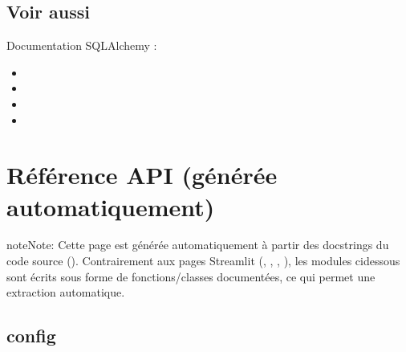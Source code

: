 \documentclass[letterpaper,10pt,english]{sphinxmanual}
\begin{document}
\section{Voir aussi}
\label{\detokenize{model:voir-aussi}}
\sphinxAtStartPar
Documentation SQLAlchemy :
\begin{itemize}
\item {} 
\sphinxAtStartPar
{}

\item {} 
\sphinxAtStartPar
{}

\item {} 
\sphinxAtStartPar
{}

\item {} 
\sphinxAtStartPar
{}

\end{itemize}

\sphinxstepscope


\chapter{Référence API (générée automatiquement)}
\label{\detokenize{api:reference-api-generee-automatiquement}}\label{\detokenize{api::doc}}
\begin{sphinxadmonition}{note}{Note:}
\sphinxAtStartPar
Cette page est générée automatiquement à partir des docstrings du code source
(). Contrairement aux pages Streamlit ({\hyperref[\detokenize{Home::doc}]{}},
{\hyperref[\detokenize{1_Integration::doc}]{}}, {\hyperref[\detokenize{2_BacLipidDB::doc}]{}}, {\hyperref[\detokenize{3_Export::doc}]{}}), les modules
ci\sphinxhyphen{}dessous sont écrits sous forme de fonctions/classes documentées, ce qui
permet une extraction automatique.
\end{sphinxadmonition}


\section{config}
\label{\detokenize{api:module-config}}\label{\detokenize{api:config}}
\end{document}
